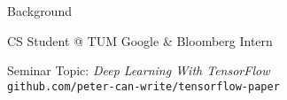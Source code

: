 
\begin{slide}{Background}
  \centering
  \begin{itemize}
    \pitem CS Student @ TUM
    \pitem Google \& Bloomberg Intern
  \end{itemize}
  \pause
  \vspace{0.6cm}
  Seminar Topic: \emph{Deep Learning With TensorFlow}\\
  \vspace{0.2cm}
  \texttt{github.com/peter-can-write/tensorflow-paper}
\end{slide}
